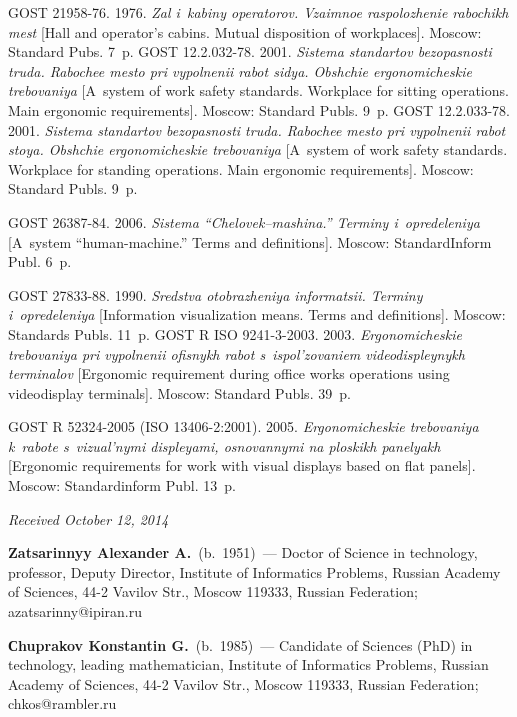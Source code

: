 \begin{multicols}{2}
{{\begin{thebibliography}{99}
GOST 21958-76. 1976. \textit{Zal i~kabiny operatorov. Vzaimnoe raspolozhenie rabochikh
mest} [Hall and operator's cabins. Mutual disposition of workplaces]. Moscow:
Standard Pubs. 7~p.
GOST 12.2.032-78. 2001. \textit{Sistema standartov bezopasnosti truda. Rabochee mesto pri
vypolnenii rabot sidya. Obshchie ergonomicheskie trebovaniya} [A~system of work safety
standards. Workplace for sitting operations. Main ergonomic requirements]. Moscow:
Standard Publs. 9~p.
GOST 12.2.033-78. 2001. \textit{Sistema standartov bezopasnosti truda. Rabochee mesto pri
vypolnenii rabot stoya. Obshchie ergonomicheskie trebovaniya} [A~system of work safety
standards. Workplace for standing operations. Main ergonomic requirements]. Moscow:
Standard Publs. 9~p.

GOST 26387-84. 2006. \textit{Sistema ``Chelovek--mashina.'' Terminy i~opredeleniya}
[A~system ``human-machine.'' Terms and definitions]. Moscow: StandardInform Publ. 6~p.

GOST 27833-88. 1990. \textit{Sredstva otobrazheniya informatsii.
Terminy i~opredeleniya}
[Information visualization means. Terms and definitions]. Moscow: Standards Publs. 11~p.
GOST R ISO 9241-3-2003. 2003. \textit{Ergonomicheskie trebovaniya pri vypolnenii ofisnykh rabot
s~ispol'zovaniem videodispleynykh terminalov} [Ergonomic requirement during office works
operations using videodisplay terminals]. Moscow: Standard Publs. 39~p.


GOST R 52324-2005 (ISO 13406-2:2001). 2005. \textit{Ergonomicheskie trebovaniya k~rabote
s~vizual'nymi displeyami, osnovannymi na ploskikh panelyakh} [Ergonomic requirements for
work with visual displays based on flat panels]. Moscow: Standardinform Publ. 13~p.

\end{thebibliography}

 }
 }

\end{multicols}

\vspace*{-6pt}

\hfill{\small\textit{Received October 12, 2014}}

\vspace*{-18pt}

\Contr

\noindent
\textbf{Zatsarinnyy Alexander A.}\ (b.\ 1951)~---
Doctor of Science in technology, professor, Deputy Director,
Institute of Informatics Problems, Russian Academy of Sciences,
44-2 Vavilov Str., Moscow 119333, Russian Federation; azatsarinny@ipiran.ru

\vspace*{3pt}

\noindent
\textbf{Сhuprakov Konstantin G.}\ (b.\ 1985)~---
Candidate of Sciences (PhD) in technology, leading mathematician,
Institute of Informatics Problems, Russian Academy of Sciences,
44-2 Vavilov Str., Moscow 119333, Russian Federation;  chkos@rambler.ru
\label{end\stat}

\renewcommand{\bibname}{\protect\rm Литература}